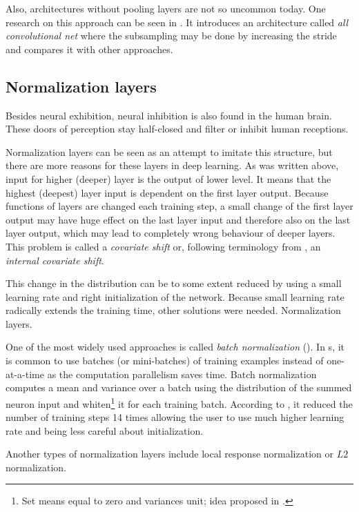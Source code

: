 Also, architectures without pooling layers are not so uncommon today. One research on this approach can be seen in \cite{all-conv-net}. It introduces an architecture called \textit{all convolutional net} where the subsampling may be done by increasing the stride and compares it with other approaches. 

\subsection{Normalization layers}
\label{norm-layers}

Besides neural exhibition, neural inhibition is also found in the human brain. These doors of perception stay half-closed and filter or inhibit human receptions.

Normalization layers can be seen as an attempt to imitate this structure, but there are more reasons for these layers in deep learning. As was written above, input for higher (deeper) layer is the output of lower level. It means that the highest (deepest) layer input is dependent on the first layer output. Because functions of layers are changed each training step, a small change of the first layer output may have huge effect on the last layer input and therefore also on the last layer output, which may lead to completely wrong behaviour of deeper layers. This problem is called a \textit{covariate shift} or, following terminology from \cite{batch-norm}, an \textit{internal covariate shift}. 

This change in the distribution can be to some extent reduced by using a small learning rate and right initialization of the network. Because small learning rate radically extends the training time, other solutions were needed. Normalization layers. 

One of the most widely used approaches is called \textit{batch normalization} (\cite{batch-norm}). In s, it is common to use batches (or mini-batches) of training examples instead of one-at-a-time as the computation parallelism saves time. Batch normalization computes a mean and variance over a batch using the distribution of the summed neuron input and whiten\footnote{Set means equal to zero and variances unit; idea proposed in \cite{tricks}.} it for each training batch. According to \cite{batch-norm}, it reduced the number of training steps 14 times allowing the user to use much higher learning rate and being less careful about initialization.

Another types of normalization layers include local response normalization or $L2$ normalization.

